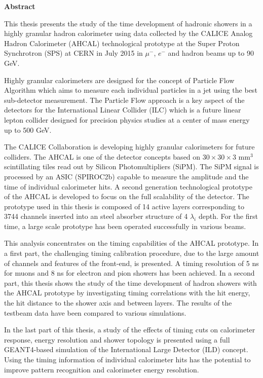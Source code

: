 \cleardoublepage
{}
{}

\thispagestyle{empty}
\begin{center}
{\bf Abstract}
\end{center}

This thesis presents the study of the time development of hadronic showers in a highly granular hadron calorimeter using data collected by the CALICE Analog Hadron Calorimeter (AHCAL) technological prototype at the Super Proton Synchrotron (SPS) at CERN in July 2015 in $\mu^-$, $e^-$ and hadron beams up to 90 GeV.

Highly granular calorimeters are designed for the concept of Particle Flow Algorithm which aims to measure each individual particles in a jet using the best sub-detector measurement. The Particle Flow approach is a key aspect of the detectors for the International Linear Collider (ILC) which is a future linear lepton collider designed for precision physics studies at a center of mass energy up to 500 GeV.

The CALICE Collaboration is developing highly granular calorimeters for future colliders. The AHCAL is one of the detector concepts based on $30\times30\times3$ mm$^3$ scintillating tiles read out by Silicon Photomultipliers (SiPM). The SiPM signal is processed by an ASIC (SPIROC2b) capable to measure the amplitude and the time of individual calorimeter hits. A second generation technological prototype of the AHCAL is developed to focus on the full scalability of the detector. The prototype used in this thesis is composed of 14 active layers corresponding to 3744 channels inserted into an steel absorber structure of 4 $\lambda_i$ depth. For the first time, a large scale prototype has been operated successfully in various beams.

This analysis concentrates on the timing capabilities of the AHCAL prototype. In a first part, the challenging timing calibration procedure, due to the large amount of channels and features of the front-end, is presented. A timing resolution of 5 ns for muons and 8 ns for electron and pion showers has been achieved. In a second part, this thesis shows the study of the time development of hadron showers with the AHCAL prototype by investigating timing correlations with the hit energy, the hit distance to the shower axis and between layers. The results of the testbeam data have been compared to various simulations.

In the last part of this thesis, a study of the effects of timing cuts on calorimeter response, energy resolution and shower topology is presented using a full GEANT4-based simulation of the International Large Detector (ILD) concept. Using the timing information of individual calorimeter hits has the potential to improve pattern recognition and calorimeter energy resolution.

